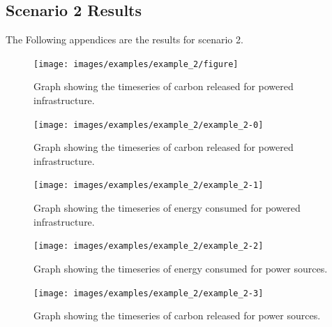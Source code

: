 \documentclass{l4proj}
\begin{document}
\begin{appendices}
\clearpage
\section{Scenario 2 Results}\label{apen:subsec:scen2}
The Following appendices are the results for scenario 2.
\begin{figure}[htbp]
    \centering
    \texttt{[image: images/examples/example\_2/figure]}
    ~
    \caption{Graph showing the timeseries of carbon released for powered infrastructure.}
    \label{fig:example2-0}
\end{figure}
\clearpage
\begin{figure}[htbp]
    \centering
    \texttt{[image: images/examples/example\_2/example\_2-0]}
    ~
    \caption{Graph showing the timeseries of carbon released for powered infrastructure.}
    \label{fig:example2-0}
\end{figure}
\clearpage
\begin{figure}[htbp]
    \centering
    \texttt{[image: images/examples/example\_2/example\_2-1]}
    ~
    \caption{Graph showing the timeseries of energy consumed for powered infrastructure.}
    \label{fig:example2-1}
\end{figure}
\clearpage
\begin{figure}[htbp]
    \centering
    \texttt{[image: images/examples/example\_2/example\_2-2]}
    ~
    \caption{Graph showing the timeseries of energy consumed for power sources.}
    \label{fig:example2-2}
\end{figure}
\clearpage
\begin{figure}[htbp]
    \centering
    \texttt{[image: images/examples/example\_2/example\_2-3]}
    ~
    \caption{Graph showing the timeseries of carbon released for power sources.}
    \label{fig:example2-3}
\end{figure}
\clearpage

\end{appendices}
\end{document}
